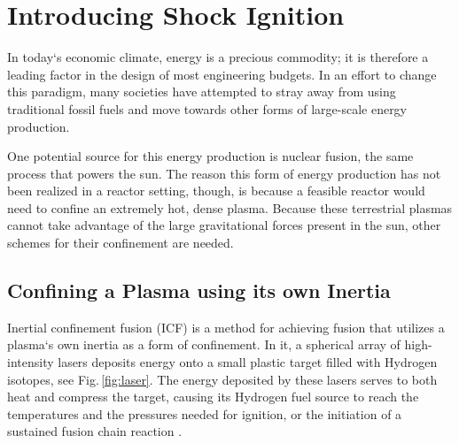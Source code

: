
\chapter[\textbf{Introducing Shock Ignition}]{Introducing Shock Ignition}

In today`s economic climate, energy is a precious commodity; it is therefore a leading factor in the design of most engineering budgets.  In an effort to change this paradigm, many societies have attempted to stray away from using traditional fossil fuels and move towards other forms of large-scale energy production.  

One potential source for this energy production is nuclear fusion, the same process that powers the sun. The reason this form of energy production has not been realized in a reactor setting, though, is because a feasible reactor would need to confine an extremely hot, dense plasma.  Because these terrestrial plasmas cannot take advantage of the large gravitational forces present in the sun, other schemes for their confinement are needed.


  \section{Confining a Plasma using its own Inertia}

Inertial confinement fusion (ICF) is a method for achieving fusion that utilizes a plasma`s own inertia as a form of confinement.  In it, a spherical array of high-intensity lasers deposits energy onto a small plastic target filled with Hydrogen isotopes, see Fig.\,\ref{fig:laser}.  The energy deposited by these lasers serves to both heat and compress the target, causing its Hydrogen fuel source to reach the temperatures and the pressures needed for ignition, or the initiation of a sustained fusion chain reaction \citep{mosesBook}.  

